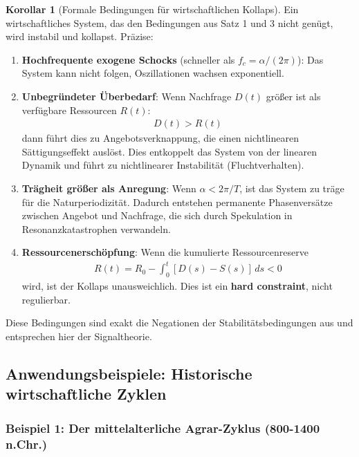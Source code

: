 \documentclass[a4paper,12pt,twoside]{report}
\theoremstyle{definition}
\newtheorem{korollar}{Korollar}
\begin{document}
\begin{korollar}[Formale Bedingungen für wirtschaftlichen Kollaps]

Ein wirtschaftliches System, das den Bedingungen aus Satz 1 und 3 nicht genügt, wird instabil und kollapst. Präzise:

\begin{enumerate}

\item \textbf{Hochfrequente exogene Schocks} (schneller als $f_c = \alpha/(2\pi)$): Das System kann nicht folgen, Oszillationen wachsen exponentiell.

\item \textbf{Unbegründeter Überbedarf}: Wenn Nachfrage $D(t)$ größer ist als verfügbare Ressourcen $R(t)$:
\begin{align}
D(t) > R(t)
\end{align}
dann führt dies zu Angebotsverknappung, die einen nichtlinearen Sättigungseffekt auslöst. Dies entkoppelt das System von der linearen Dynamik und führt zu nichtlinearer Instabilität (Fluchtverhalten).

\item \textbf{Trägheit größer als Anregung}: Wenn $\alpha < 2\pi/T$, ist das System zu träge für die Naturperiodizität. Dadurch entstehen permanente Phasenversätze zwischen Angebot und Nachfrage, die sich durch Spekulation in Resonanzkatastrophen verwandeln.

\item \textbf{Ressourcenerschöpfung}: Wenn die kumulierte Ressourcenreserve
\begin{align}
R(t) = R_0 - \int_0^t [D(s) - S(s)] \, ds < 0
\end{align}
wird, ist der Kollaps unausweichlich. Dies ist ein \textbf{hard constraint}, nicht regulierbar.

\end{enumerate}

Diese Bedingungen sind exakt die Negationen der Stabilitätsbedingungen aus \cite{epp_signal} und entsprechen hier der Signaltheorie.

\end{korollar}

\subsection{Anwendungsbeispiele: Historische wirtschaftliche Zyklen}

\subsubsection{Beispiel 1: Der mittelalterliche Agrar-Zyklus (800-1400 n.Chr.)}
\end{document}
